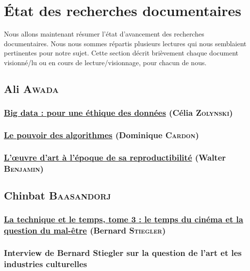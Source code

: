 \documentclass[a4paper,10pt]{article}
\begin{document}
\section{État des recherches documentaires}
\label{section_lectures}

Nous allons maintenant résumer l'état d'avancement des recherches documentaires. Nous nous sommes répartis plusieurs lectures qui nous semblaient pertinentes pour notre sujet. Cette section décrit brièvement chaque document visionné/lu ou en cours de lecture/visionnage, pour chacun de nous.

\subsection{Ali \textsc{Awada}}

\subsubsection{\underline{Big data : pour une éthique des données} (Célia \textsc{Zolynski})}

\subsubsection{\underline{Le pouvoir des algorithmes} (Dominique \textsc{Cardon})}

\subsubsection{\underline{L'\oe{}uvre d'art à l'époque de sa reproductibilité} (Walter \textsc{Benjamin})}

\subsection{Chinbat \textsc{Baasandorj}}

\subsubsection{\underline{La technique et le temps, tome 3 : le temps du cinéma et la question du mal-être} (Bernard \textsc{Stiegler})}

\subsubsection{Interview de Bernard Stiegler sur la question de l'art et les industries culturelles}
\end{document}
